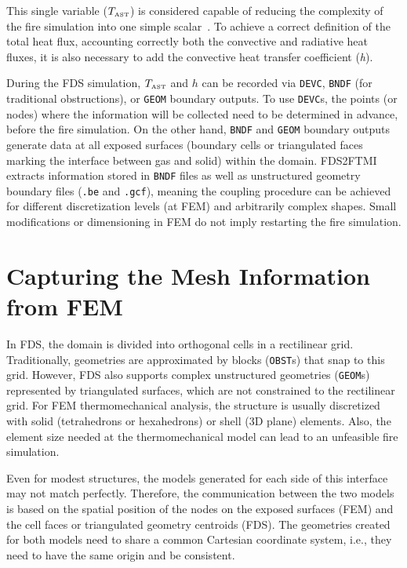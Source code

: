 \documentclass[11pt]{book}
\newcommand{\textct}[1]{\texttt{#1}}
\begin{document}
This single variable ($T_{\hbox{\tiny AST}}$) is considered capable of reducing the complexity of the fire simulation into one simple scalar~\cite{FTMI:Duthinh,FTMI:Sandstrom,FTMI:Wickstrom2010}. To achieve a correct definition of the total heat flux, accounting correctly both the convective and radiative heat fluxes, it is also necessary to add the convective heat transfer coefficient (\textit{h}). 
 
During the FDS simulation, $T_{\hbox{\tiny AST}}$ and $h$ can be recorded via \textct{DEVC}, \textct{BNDF} (for traditional obstructions), or \textct{GEOM} boundary outputs. To use \textct{DEVC}s, the points (or nodes) where the information will be collected need to be determined in advance, before the fire simulation. On the other hand, \textct{BNDF} and \textct{GEOM} boundary outputs generate data at all exposed surfaces (boundary cells or triangulated faces marking the interface between gas and solid) within the domain. FDS2FTMI extracts information stored in \textct{BNDF} files as well as unstructured geometry boundary files (\textct{.be} and \textct{.gcf}), meaning the coupling procedure can be achieved for different discretization levels (at FEM) and arbitrarily complex shapes. Small modifications or dimensioning in FEM do not imply restarting the fire simulation. 
  
\section{Capturing the Mesh Information from FEM}

In FDS, the domain is divided into orthogonal cells in a rectilinear grid. Traditionally, geometries are approximated by blocks (\textct{OBST}s) that snap to this grid. However, FDS also supports complex unstructured geometries (\textct{GEOM}s) represented by triangulated surfaces, which are not constrained to the rectilinear grid. For FEM thermomechanical analysis, the structure is usually discretized with solid (tetrahedrons or hexahedrons) or shell (3D plane) elements. Also, the element size needed at the thermomechanical model can lead to an unfeasible fire simulation. 

Even for modest structures, the models generated for each side of this interface may not match perfectly. Therefore, the communication between the two models is based on the spatial position of the nodes on the exposed surfaces (FEM) and the cell faces or triangulated geometry centroids (FDS). The geometries created for both models need to share a common Cartesian coordinate system, i.e., they need to have the same origin and be consistent. 
\end{document}
